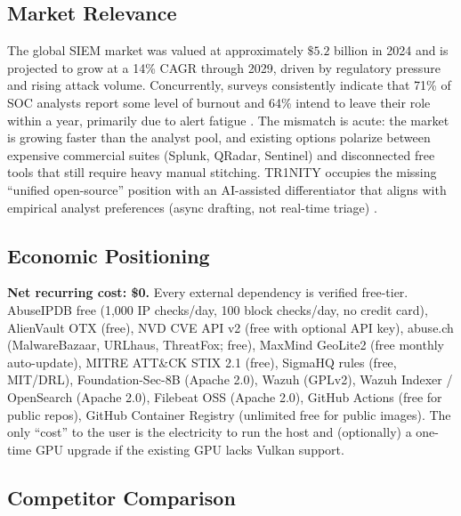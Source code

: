 \documentclass[11pt,a4paper]{article}
\begin{document}
\subsection{Market Relevance}
The global SIEM market was valued at approximately $\$5.2$ billion in 2024 and is projected to grow at a 14\% CAGR through 2029, driven by regulatory pressure and rising attack volume. Concurrently, surveys consistently indicate that 71\% of SOC analysts report some level of burnout and 64\% intend to leave their role within a year, primarily due to alert fatigue \cite{secure2024burnout}. The mismatch is acute: the market is growing faster than the analyst pool, and existing options polarize between expensive commercial suites (Splunk, QRadar, Sentinel) and disconnected free tools that still require heavy manual stitching. TR1NITY occupies the missing ``unified open-source'' position with an AI-assisted differentiator that aligns with empirical analyst preferences (async drafting, not real-time triage) \cite{darrow2024aisoc}.

\subsection{Economic Positioning}
\textbf{Net recurring cost: \$0.} Every external dependency is verified free-tier. AbuseIPDB free (1,000 IP checks/day, 100 block checks/day, no credit card), AlienVault OTX (free), NVD CVE API v2 (free with optional API key), abuse.ch (MalwareBazaar, URLhaus, ThreatFox; free), MaxMind GeoLite2 (free monthly auto-update), MITRE ATT\&CK STIX 2.1 (free), SigmaHQ rules (free, MIT/DRL), Foundation-Sec-8B (Apache 2.0), Wazuh (GPLv2), Wazuh Indexer / OpenSearch (Apache 2.0), Filebeat OSS (Apache 2.0), GitHub Actions (free for public repos), GitHub Container Registry (unlimited free for public images). The only ``cost'' to the user is the electricity to run the host and (optionally) a one-time GPU upgrade if the existing GPU lacks Vulkan support.

\subsection{Competitor Comparison}
\end{document}

